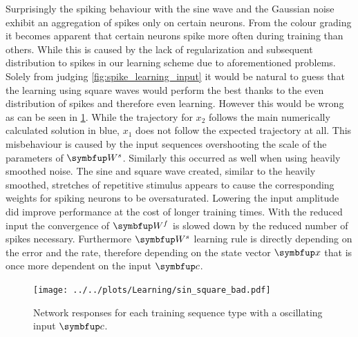 Surprisingly the spiking behaviour with the sine wave and the Gaussian noise exhibit an aggregation of spikes only on certain neurons. From the colour grading it becomes apparent that certain neurons spike more often during training than others. While this is caused by the lack of regularization and subsequent distribution to spikes in our learning scheme due to aforementioned problems. Solely from judging \cref{fig:spike_learning_input} it would be natural to guess that the learning using square waves would perform the best thanks to the even distribution of spikes and therefore even learning. However this would be wrong as can be seen in \cref{fig:sin_square_bad}. While the trajectory for $x_2$ follows the main numerically calculated solution in blue, $x_1$ does not follow the expected trajectory at all. This misbehaviour is caused by the input sequences overshooting the scale of the parameters of $\bmu{W}^s$. Similarly this occurred as well when using heavily smoothed noise. The sine and square wave created, similar to the heavily smoothed, stretches of repetitive stimulus appears to cause the corresponding weights for spiking neurons to be oversaturated. Lowering the input amplitude did improve performance at the cost of longer training times. With the reduced input the convergence of $\bmu{W}^f$ is slowed down by the reduced number of spikes necessary. Furthermore $\bmu{W}^s$ learning rule is directly depending on the error and the rate, therefore depending on the state vector $\bmu{x}$ that is once more dependent on the input $\bmu{c}$.
\begin{figure}
	\centering
	\texttt{[image: ../../plots/Learning/sin\_square\_bad.pdf]}
	\caption{Network responses for each training sequence type with a oscillating input $\bmu{c}$.}
	\label{fig:sin_square_bad}
\end{figure}


